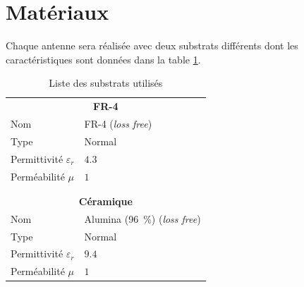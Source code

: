\documentclass[Deriaz_Traiber_Labo02.tex]{subfiles}
\begin{document}
\section{Matériaux}
Chaque antenne sera réalisée avec deux substrats différents dont les caractéristiques sont données dans la table \ref{tab_substrats}. 

\begin{table}[H]
\centering
\begin{tabular}{ l  l }
\multicolumn{2}{c}{\textbf{FR-4}}\\
Nom & FR-4 (\textit{loss free})\\
Type & Normal \\
Permittivité $\varepsilon_r$ & $\SI{4.3}{}$ \\
Perméabilité $\mu$	& $1$ \\\\
\\
\multicolumn{2}{c}{\textbf{Céramique}}\\
Nom & Alumina (\SI{96}{\percent}) (\textit{loss free})\\
Type & Normal\\
Permittivité $\varepsilon_r$ & $\SI{9.4}{}$ \\
Perméabilité $\mu$	& $1$
\end{tabular}
\caption{Liste des substrats utilisés}
\label{tab_substrats}
\end{table}
\end{document}

